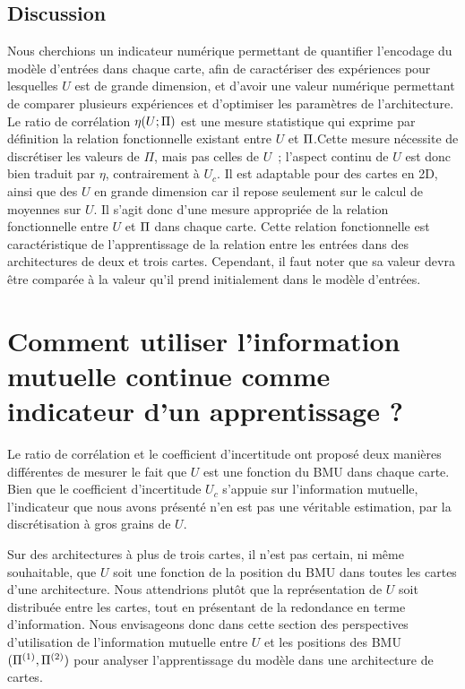 \documentclass[../main]{subfiles}
\begin{document}
\subsection{Discussion}

Nous cherchions un indicateur numérique permettant de quantifier l'encodage du modèle d'entrées dans chaque carte, afin de caractériser des expériences pour lesquelles $U$ est de grande dimension, et d'avoir une valeur numérique permettant de comparer plusieurs expériences et d'optimiser les paramètres de l'architecture.
Le ratio de corrélation $\eta(U;\Pi)$ est une mesure statistique qui exprime par définition la relation fonctionnelle existant entre $U$ et $\Pi$.Cette mesure nécessite de discrétiser les valeurs de $\Pi$, mais pas celles de $U$~; l'aspect continu de $U$ est donc bien traduit par $\eta$, contrairement à $U_c$.
Il est adaptable pour des cartes en 2D, ainsi que des $U$ en grande dimension car il repose seulement sur le calcul de moyennes sur $U$.
Il s'agit donc d'une mesure appropriée de la relation fonctionnelle entre $U$ et $\Pi$ dans chaque carte.
Cette relation fonctionnelle est caractéristique de l'apprentissage de la relation entre les entrées dans des architectures de deux et trois cartes.
Cependant, il faut noter que sa valeur devra être comparée à la valeur qu'il prend initialement dans le modèle d'entrées.

\section{Comment utiliser l'information mutuelle continue comme indicateur d'un apprentissage ?}

Le ratio de corrélation et le coefficient d'incertitude ont proposé deux manières différentes de mesurer le fait que $U$ est une fonction du BMU dans chaque carte.
Bien que le coefficient d'incertitude $U_c$ s'appuie sur l'information mutuelle, l'indicateur que nous avons présenté n'en est pas une véritable estimation, par la discrétisation à gros grains de $U$.

Sur des architectures à plus de trois cartes, il n'est pas certain, ni même souhaitable, que $U$ soit une fonction de la position du BMU dans toutes les cartes d'une architecture. Nous attendrions plutôt que la représentation de $U$ soit distribuée entre les cartes, tout en présentant de la redondance en terme d'information.
Nous envisageons donc dans cette section des perspectives d'utilisation de l'information mutuelle entre $U$ et les positions des BMU $(\Pi^{({1})}, \Pi^{({2})})$ pour analyser l'apprentissage du modèle dans une architecture de cartes.
\end{document}
